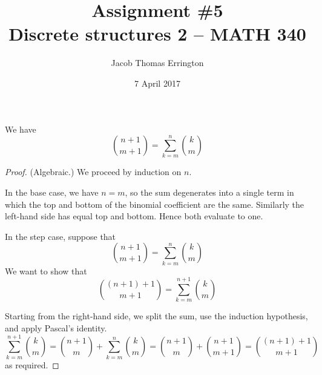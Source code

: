 \documentclass[11pt]{article}
\author{Jacob Thomas Errington}
\title{Assignment \#5\\Discrete structures 2 -- MATH 340}
\date{7 April 2017}
\begin{document}
\maketitle


\begin{prop}
    We have
    \begin{equation}
        \label{eq:identity}
        \binom{n+1}{m+1} = \sum_{k=m}^n \binom{k}{m}
    \end{equation}
\end{prop}

\begin{proof}{(Algebraic.)}
    We proceed by induction on $n$.

    In the base case, we have $n = m$, so the sum degenerates into a single
    term in which the top and bottom of the binomial coefficient are the same.
    Similarly the left-hand side has equal top and bottom. Hence both evaluate
    to one.

    In the step case, suppose that
    \begin{equation*}
        \binom{n+1}{m+1} = \sum_{k=m}^n \binom{k}{m}
    \end{equation*}
    We want to show that
    \begin{equation*}
        \binom{(n+1) + 1}{m+1} = \sum_{k=m}^{n+1} \binom{k}{m}
    \end{equation*}

    Starting from the right-hand side, we split the sum, use the induction
    hypothesis, and apply Pascal's identity.
    \begin{equation*}
        \sum_{k=m}^{n+1} \binom{k}{m}
        =
        \binom{n+1}{m} + \sum_{k=m}^n \binom{k}{m}
        =
        \binom{n+1}{m} + \binom{n+1}{m+1}
        =
        \binom{(n+1)+1}{m+1}
    \end{equation*}
    as required.
\end{proof}
\end{document}

